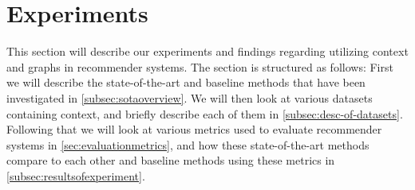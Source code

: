 \section{Experiments}\label{sec:experiments}
This section will describe our experiments and findings regarding utilizing context and graphs in recommender systems.
The section is structured as follows: First we will describe the state-of-the-art and baseline methods that have been investigated in \autoref{subsec:sotaoverview}.
We will then look at various datasets containing context, and briefly describe each of them in \autoref{subsec:desc-of-datasets}.
Following that we will look at various metrics used to evaluate recommender systems in \autoref{sec:evaluationmetrics}, and how these state-of-the-art methods compare to each other and baseline methods using these metrics in \autoref{subsec:resultsofexperiment}.








